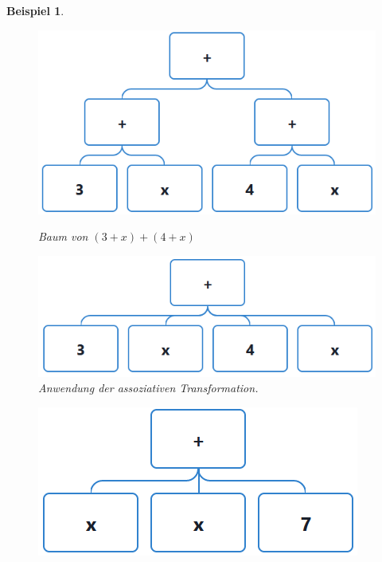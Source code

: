 \documentclass[11pt]{article}
\newtheorem{example}{Beispiel}
\begin{document}
\begin{example} \normalfont
  \begin{figure}[h]
    \begin{minipage}{.5\textwidth}
      \centering
      \includegraphics[scale=0.45]{trees/sum/beispiel_1_1.png}
      \caption{Baum von $(3+x)+(4+x)$}
    \end{minipage}
    \begin{minipage}{.5\textwidth}
      \centering
      \includegraphics[scale=0.45]{trees/sum/beispiel_1_2.png}
      \caption{Anwendung der assoziativen Transformation.}
    \end{minipage}
  \end{figure}
  \begin{figure}[h]
    \begin{minipage}{.5\textwidth}
      \centering
      \includegraphics[scale=0.45]{trees/sum/beispiel_1_3.png}

\end{minipage}
\end{figure}
\end{example}
\end{document}
